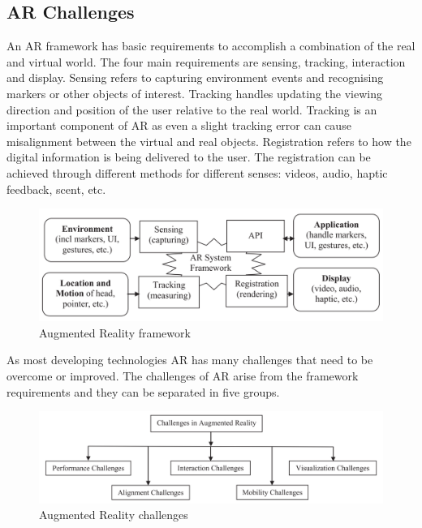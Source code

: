 \documentclass[12pt, a4paper,oneside, nocenter]{thesis}
\begin{document}
\subsection{AR Challenges}
An AR framework has basic requirements to accomplish a combination of the real and virtual world.
The four main requirements are sensing, tracking, interaction and display. Sensing refers to
capturing environment events and recognising markers or other objects of interest. Tracking handles updating the
viewing direction and position of the user relative to the real world. Tracking is an important component
of AR as even a slight tracking error can cause misalignment between the virtual and real objects\citep{ar-design}. 
Registration refers to how the digital information is being delivered to the user. The registration can be achieved
through different methods for different senses: videos, audio, haptic feedback, scent, etc.
\begin{figure}[H]
\includegraphics[width=\textwidth]{ar-framework}
\caption{Augmented Reality framework\citep{vrjournal}}
\label{fig:ar-framework}
\end{figure}
As most developing technologies AR has many challenges that need to be overcome or improved.
The challenges of AR arise from the framework requirements and they can be separated in five groups.
\begin{figure}[H]
\includegraphics[width=\textwidth]{ar-challenges}
\caption{Augmented Reality challenges\citep{Acta-Graphica}}
\label{fig:ar-challenges}
\end{figure}
\end{document}
